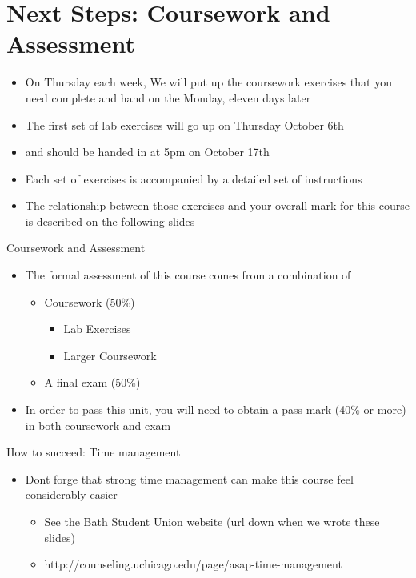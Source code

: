 \documentclass{beamer}
\begin{document}
\section{Next Steps: Coursework and Assessment}
\begin{frame}
\begin{itemize}
\item On Thursday each week, We will put up the coursework exercises that you need complete and hand on the Monday, eleven days later
\item The first set of lab exercises will go up on Thursday October 6th
\item and should be handed in at 5pm on October 17th
\item Each set of exercises is accompanied by a detailed set of instructions
\item The relationship between those exercises and your overall mark for this course is described on the following slides
\end{itemize}
\end{frame}

\begin{frame}
Coursework and Assessment

\begin{itemize}
\item The formal assessment of this course comes from a combination of

\begin{itemize}
\item Coursework (50\%)

\begin{itemize}
\item Lab Exercises
\item Larger Coursework
\end{itemize}
\item A final exam (50\%)
\end{itemize}
\item In order to pass this unit, you will need to obtain a pass mark (40\% or more) in both coursework and exam
\end{itemize}
\end{frame} 

 \begin{frame}

How to succeed: Time management

\begin{itemize}
\item Dont forge that strong time management can make this course feel considerably easier

\begin{itemize}
\item See the Bath Student Union website (url down when we wrote these slides)
\item http://counseling.uchicago.edu/page/asap-time-management 
\end{itemize}
\end{itemize}
\end{frame}
\end{document}
